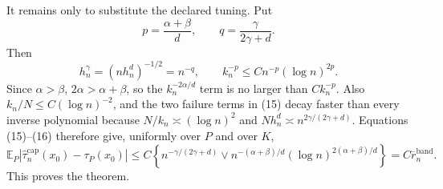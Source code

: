 It remains only to substitute the declared tuning.  Put
\[
p=\frac{\alpha+\beta}{d},\qquad
q=\frac{\gamma}{2\gamma+d}.
\]
Then
\[
h_n^\gamma=(nh_n^d)^{-1/2}=n^{-q},
\qquad
k_n^{-p}\leq Cn^{-p}(\log n)^{2p}. \tag{16}
\]
Since \(\alpha>\beta\), \(2\alpha>\alpha+\beta\), so the
\(k_n^{-2\alpha/d}\) term is no larger than \(Ck_n^{-p}\).  Also
\(k_n/N\leq C(\log n)^{-2}\), and the two failure terms in (15) decay
faster than every inverse polynomial because
\(N/k_n\asymp(\log n)^2\) and
\(Nh_n^d\asymp n^{2\gamma/(2\gamma+d)}\).  Equations (15)--(16) therefore
give, uniformly over \(P\) and over \(K\),
\[
\mathbb E_P|\widehat\tau_n^{\mathrm{cap}}(x_0)-\tau_P(x_0)|
\leq C\left\{n^{-\gamma/(2\gamma+d)}
\vee n^{-(\alpha+\beta)/d}(\log n)^{2(\alpha+\beta)/d}\right\}
=C\overline r_n^{\mathrm{band}}.
\]
This proves the theorem.